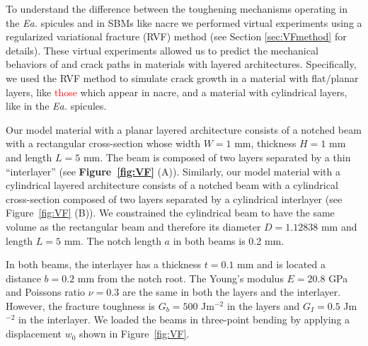 \documentclass[12pt,onecolumn]{article}
\makeatletter
\newcommand{\EA}{\textit{Ea.\@}\xspace}
\makeatother
\begin{document}
\begin{bibunit}
To understand the difference between the toughening mechanisms operating in the \EA spicules and in SBMs like nacre we performed virtual experiments using a regularized variational fracture (RVF) method (see Section \ref{sec:VFmethod} for details). These virtual experiments allowed us to predict the  mechanical behaviors of and crack paths in materials with layered architectures. Specifically, we used the RVF method to simulate crack growth in a material with flat/planar layers, like \textcolor{red}{those} which appear in nacre, and a material with cylindrical layers, like in the \EA spicules.

Our model material with a planar layered architecture consists of a notched beam with a rectangular cross-section whose width $W=1$ mm, thickness $H=1$ mm and length $L=5$ mm. The beam is composed of two layers separated by a thin ``interlayer'' (see {\bf Figure~\ref{fig:VF}} (A)). Similarly, our model material with a cylindrical layered architecture consists of a notched beam with a cylindrical cross-section composed of two layers separated by a cylindrical interlayer (see Figure~\ref{fig:VF} (B)). We constrained the cylindrical beam to have the same volume as the rectangular beam and therefore its diameter $D=1.12838$ mm and length $L=5$ mm. The notch length $a$ in both beams is 0.2 mm.

In both beams, the interlayer has a thickness $t = 0.1$ mm and is located a distance $b = 0.2$ mm from the notch root.  The Young's modulus $E = 20.8$ GPa and Poissons ratio $\nu = 0.3$ are the same in both the layers and the interlayer. However, the fracture toughness is $G_b = 500$ Jm$^{-2}$ in the layers and $G_I = 0.5$ Jm$^{-2}$ in the interlayer. We loaded the beams in three-point bending by applying a displacement $w_0$ shown in Figure~\ref{fig:VF}. 


\end{bibunit}
\end{document}
